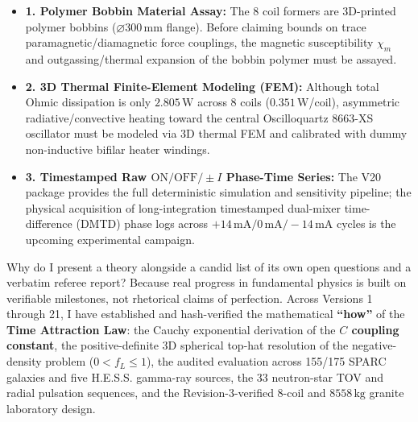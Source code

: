 \begin{itemize}\setlength{\itemsep}{1pt}\setlength{\parskip}{0pt}\setlength{\topsep}{1pt}
  \item \textbf{1. Polymer Bobbin Material Assay:} The 8 coil formers are 3D-printed polymer bobbins ($\varnothing 300\,\text{mm}$ flange). Before claiming bounds on trace paramagnetic/diamagnetic force couplings, the magnetic susceptibility $\chi_m$ and outgassing/thermal expansion of the bobbin polymer must be assayed.
  \item \textbf{2. 3D Thermal Finite-Element Modeling (FEM):} Although total Ohmic dissipation is only $2.805\,\text{W}$ across 8 coils ($0.351\,\text{W}$/coil), asymmetric radiative/convective heating toward the central Oscilloquartz 8663-XS oscillator must be modeled via 3D thermal FEM and calibrated with dummy non-inductive bifilar heater windings.
  \item \textbf{3. Timestamped Raw $\text{ON}/\text{OFF}/\pm I$ Phase-Time Series:} The V20 package provides the full deterministic simulation and sensitivity pipeline; the physical acquisition of long-integration timestamped dual-mixer time-difference (DMTD) phase logs across $+14\,\text{mA} / 0\,\text{mA} / -14\,\text{mA}$ cycles is the upcoming experimental campaign.
\end{itemize}

\vspace{1.5mm}
\noindent{\color{navy}\rule{\linewidth}{0.6pt}}\par\vspace{1.5mm}
\par\vspace{1pt}
Why do I present a theory alongside a candid list of its own open questions and a verbatim referee report? Because real progress in fundamental physics is built on verifiable milestones, not rhetorical claims of perfection. Across Versions 1 through 21, I have established and hash-verified the mathematical \textbf{``how''} of the \textbf{Time Attraction Law}: the Cauchy exponential derivation of the \textbf{$C$ coupling constant}, the positive-definite 3D spherical top-hat resolution of the negative-density problem ($0 < f_L \le 1$), the audited evaluation across 155/175 SPARC galaxies and five H.E.S.S. gamma-ray sources, the 33 neutron-star TOV and radial pulsation sequences, and the Revision-3-verified 8-coil and $8558\,\text{kg}$ granite laboratory design.

